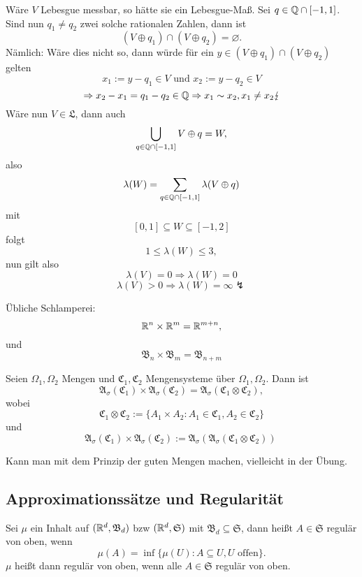 			\begin{bew}
				Wäre $V$ Lebesgue messbar, so hätte sie ein Lebesgue-Maß. Sei $q\in\mathbb{Q}\cap[-1,1]$. Sind nun $q_1\neq q_2$ zwei solche rationalen Zahlen, dann ist
				\[ (V\oplus q_1)\cap (V\oplus q_2)=\varnothing. \]
				Nämlich: Wäre dies nicht so, dann würde für ein $y\in(V\oplus q_1)\cap (V\oplus q_2)$ gelten
				\[ x_1:=y-q_1\in V\text{ und } x_2:=y-q_2\in V \]
				\[ \Rightarrow x_2-x_1=q_1-q_2\in \mathbb{Q}\Rightarrow x_1\sim x_2, x_1\neq x_2\lightning \]
				Wäre nun $V\in\mathfrak{L}$, dann auch
				\[ \bigcup_{q\in\mathbb{Q}\cap[-1,1]}V\oplus q=W, \]
				also
				\[ \lambda(W)=\sum_{q\in\mathbb{Q}\cap[-1,1]}\lambda(V\oplus q) \]
				mit 
				\[ [0,1]\subseteq W\subseteq[-1,2] \]
				folgt
				\[ 1\le\lambda(W)\le 3, \]
				nun gilt also
				\[ \lambda(V)=0\Rightarrow \lambda(W)=0 \]
				\[ \lambda(V)>0\Rightarrow\lambda(W)=\infty  \lightning \]
			\end{bew}
			
			\begin{bem}
				Übliche Schlamperei:
				\[ \mathbb{R}^n\times\mathbb{R}^m=\mathbb{R}^{m+n},  \]
				und
				\[ \mathfrak{B}_n\times\mathfrak{B}_m=\mathfrak{B}_{n+m} \]
			\end{bem}
			
			\begin{satz}
				Seien $\Omega_1,\Omega_2$ Mengen und $\mathfrak{C}_1, \mathfrak{C}_2$ Mengensysteme über $\Omega_1,\Omega_2$. Dann ist
				\[ \mathfrak{A}_\sigma(\mathfrak{C}_1)\times \mathfrak{A}_\sigma(\mathfrak{C}_2)=\mathfrak{A}_\sigma(\mathfrak{C}_1\otimes\mathfrak{C}_2), \]
				wobei
				\[ \mathfrak{C}_1\otimes\mathfrak{C}_2:=\{A_1\times A_2: A_1\in \mathfrak{C}_1, A_2\in\mathfrak{C}_2\} \]
				und
				\[ \mathfrak{A}_\sigma(\mathfrak{C}_1)\times\mathfrak{A}_\sigma(\mathfrak{C}_2):=\mathfrak{A}_\sigma(\mathfrak{A}_\sigma(\mathfrak{C}_1\otimes\mathfrak{C}_2))\ \]
			\end{satz}
			
			\begin{bew}
				Kann man mit dem Prinzip der guten Mengen machen, vielleicht in der Übung. 
			\end{bew}
			
		\subsection{Approximationssätze und Regularität}
			
			\begin{defi}
				Sei $\mu$ ein Inhalt auf $(\mathbb{R}^d, \mathfrak{B}_d)$ bzw $(\mathbb{R}^d, \mathfrak{S})$ mit $\mathfrak{B}_d\subseteq\mathfrak{S}$, dann heißt $A\in\mathfrak{S}$ regulär von oben, wenn
				\[ \mu(A)=\inf\{\mu(U):A\subseteq U, U\text{ offen}\}. \]
				$\mu$ heißt dann regulär von oben, wenn alle $A\in\mathfrak{S}$ regulär von oben. 
			\end{defi}
			
